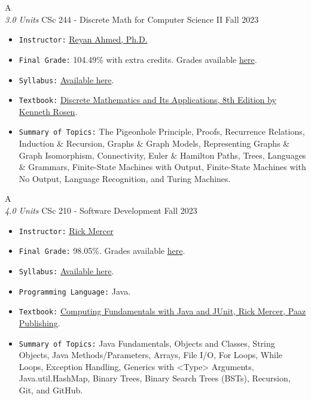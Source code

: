 \cventry
{A \\ \small{\textit{3.0 Units}}}
{CSc 244 - Discrete Math for Computer Science II}
{Fall 2023}
{}
{}
{
  \begin{itemize}
    \item \texttt{Instructor:} \href{https://www.cs.arizona.edu/person/reyan-ahmed}{Reyan Ahmed, Ph.D.}
    \item \texttt{Final Grade:} 104.49\% with extra credits. Grades available \href{https://mhrezaei.com/assets/cv/courses/Fall2023/CSC244/Grades.pdf}{here}.
    \item \texttt{Syllabus:} \href{https://mhrezaei.com/assets/cv/courses/Fall2023/CSC244/Syllabus.pdf}{Available here}.
    \item \texttt{Textbook:} \href{https://www.mheducation.com/highered/product/M125967651X.html}{Discrete Mathematics and Its Applications, 8th Edition by Kenneth Rosen}.
    \item \texttt{Summary of Topics:} The Pigeonhole Principle, Proofs, Recurrence Relations, Induction \& Recursion, Graphs \& Graph Models, Representing Graphs \& Graph Isomorphism, Connectivity, Euler \& Hamilton Paths, Trees, Languages \& Grammars, Finite-State Machines with Output, Finite-State Machines with No Output, Language Recognition, and Turing Machines.
  \end{itemize}
}

\cventry
{A \\ \small{\textit{4.0 Units}}}
{CSc 210 - Software Development}
{Fall 2023}
{}
{}
{
  \begin{itemize}
    \item \texttt{Instructor:} \href{https://www.cs.arizona.edu/person/rick-mercer}{Rick Mercer}
    \item \texttt{Final Grade:} 98.05\%. Grades available \href{https://mhrezaei.com/assets/cv/courses/Fall2023/CSC210/Grades.pdf}{here}.
    \item \texttt{Syllabus:} \href{https://mhrezaei.com/assets/cv/courses/Fall2023/CSC210/Syllabus.pdf}{Available here}.
    \item \texttt{Programming Language:} Java.
    \item \texttt{Textbook:} \href{https://www.lulu.com/shop/rick-mercer/computing-fundamentals-with-java-and-junit/paperback/product-23373195.html?page=1&pageSize=4}{Computing Fundamentals with Java and JUnit, Rick Mercer, Paaz Publishing}.
    \item \texttt{Summary of Topics:} Java Fundamentals, Objects and Classes, String Objects, Java Methods/Parameters, Arrays, File I/O, For Loops, While Loops, Exception Handling, Generics with <Type> Arguments, Java.util.HashMap, Binary Trees, Binary Search Trees (BSTs), Recursion, Git, and GitHub.
  \end{itemize}
}

